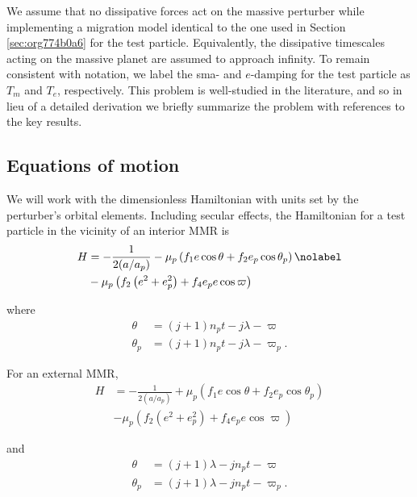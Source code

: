 \documentclass[usenatbib,twocolumn]{mnras}
\begin{document}
We assume that no dissipative forces act on the massive perturber
while implementing a migration model identical to the one used in
Section \ref{sec:org774b0a6} for the test particle.
Equivalently, the dissipative timescales acting on the massive planet
are assumed to approach infinity.  To remain consistent with notation,
we label the sma- and \(e\text{-damping}\) for the test particle as
\(T_{m}\) and \(T_{e}\), respectively. This problem is well-studied in the
literature, and so in lieu of a detailed derivation we briefly
summarize the problem with references to the key results.

\subsection{Equations of motion}
\label{sec:orgcc4813c}
We will work with the dimensionless Hamiltonian with units set by the
perturber's orbital elements.  Including secular effects, the
Hamiltonian for a test particle in the vicinity of an interior MMR is
\citep[c.f.][]{xu_migration_2018,goldreich_overstable_2014,wisdom_canonical_1986,deck_migration_2015,henrard86_reduc_trans_apocen_librat}
\begin{align}
  \label{eq:tpint}
  H
  &= - \frac{1}{2(a/a_p)} - \mu_p\left(f_1
    e\cos\theta +f_2 e_p\cos\theta_p\right) \nolabel\\
  &- \mu_p \left(f_2\left(e^2 + e_p^2\right)
    + f_4e_p e\cos\varpi\right)
\end{align}

\noindent
where
\begin{align}
  \theta &= (j+1)n_p t - j\lambda - \varpi \\
  \theta_p &= (j+1)n_p t - j\lambda - \varpi_p.
\end{align}

\noindent
For an external MMR, 
\begin{align*}
  \label{eq:tpext}
  H
  &= - \frac{1}{2(a/a_p)} + \mu_p\left(f_1
    e\cos\theta +f_2
    e_p\cos\theta_p\right) \\
  &- \mu_p \left(f_2\left(e^2
      + e_p^2\right) + f_4e_p
    e\cos\varpi\right)
\end{align*}

\noindent
and
\begin{align}
  \theta &= (j+1)\lambda - jn_pt - \varpi \\
  \theta_p &= (j+1)\lambda - jn_pt - \varpi_p.
\end{align}
\end{document}
